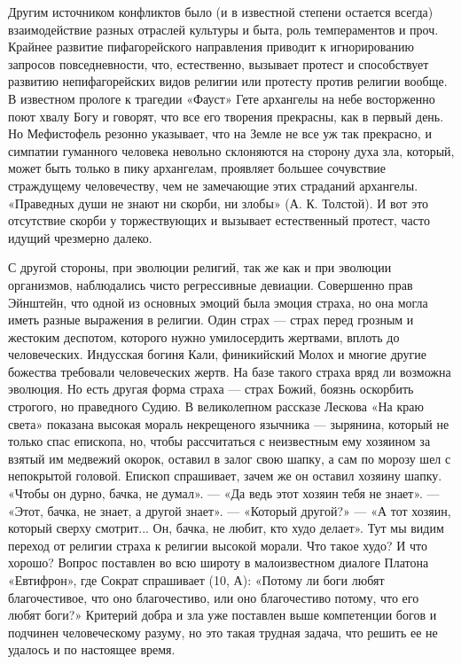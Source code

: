 Другим  источником конфликтов  было  (и в  известной степени  остается
всегда)  взаимодействие   разных  отраслей   культуры  и   быта,  роль
темпераментов  и  проч.  Крайнее развитие  пифагорейского  направления
приводит  к игнорированию  запросов повседневности,  что, естественно,
вызывает протест и способствует развитию непифагорейских видов религии
или протесту  против религии  вообще. В  известном прологе  к трагедии
«Фауст» Гете архангелы на небе  восторженно поют хвалу Богу и говорят,
что  все его  творения прекрасны,  как в  первый день.  Но Мефистофель
резонно указывает,  что на Земле не  все уж так прекрасно,  и симпатии
гуманного человека  невольно склоняются на сторону  духа зла, который,
может  быть только  в  пику архангелам,  проявляет большее  сочувствие
страждущему человечеству, чем не  замечающие этих страданий архангелы.
«Праведных души не  знают ни скорби, ни злобы» (А.  К. Толстой). И вот
это отсутствие скорби у торжествующих и вызывает естественный протест,
часто идущий чрезмерно далеко.

С другой  стороны, при  эволюции религий,  так же  как и  при эволюции
организмов, наблюдались  чисто регрессивные девиации.  Совершенно прав
Эйнштейн,  что одной  из основных  эмоций была  эмоция страха,  но она
могла иметь  разные выражения  в религии. Один  страх ---  страх перед
грозным  и жестоким  деспотом, которого  нужно умилосердить  жертвами,
вплоть  до человеческих.  Индусская богиня  Кали, финикийский  Молох и
многие другие  божества требовали  человеческих жертв. На  базе такого
страха  вряд ли  возможна эволюция.  Но есть  другая форма  страха ---
страх  Божий,  боязнь  оскорбить  строгого,  но  праведного  Судию.  В
великолепном рассказе Лескова «На  краю света» показана высокая мораль
некрещеного язычника  --- зырянина,  который не только  спас епископа,
но,  чтобы  рассчитаться  с  неизвестным ему  хозяином  за  взятый  им
медвежий окорок,  оставил в залог  свою шапку, а  сам по морозу  шел с
непокрытой головой.  Епископ спрашивает,  зачем же он  оставил хозяину
шапку. «Чтобы  он дурно, бачка,  не думал».  --- «Да ведь  этот хозяин
тебя  не знает».  --- «Этот,  бачка, не  знает, а  другой знает».  ---
«Который другой?»  --- «А  тот хозяин,  который сверху  смотрит... Он,
бачка, не  любит, кто худо  делает». Тут  мы видим переход  от религии
страха к религии высокой морали. Что  такое худо? И что хорошо? Вопрос
поставлен во  всю широту  в малоизвестном диалоге  Платона «Евтифрон»,
где Сократ  спрашивает (10, А):  «Потому ли боги  любят благочестивое,
что  оно благочестиво,  или  оно благочестиво  потому,  что его  любят
боги?» Критерий  добра и  зла уже поставлен  выше компетенции  богов и
подчинен человеческому разуму, но это такая трудная задача, что решить
ее не удалось и по настоящее время.

